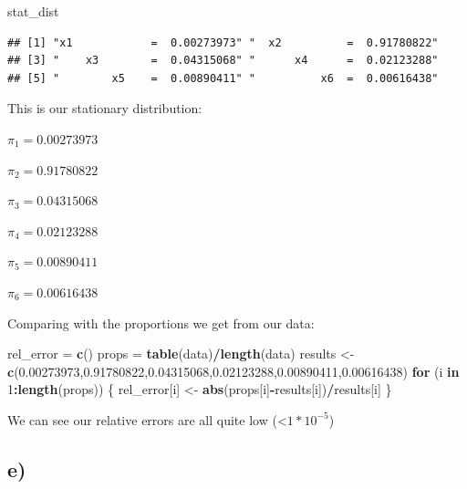\documentclass[]{article}
\newenvironment{Shaded}{\begin{snugshade}}{\end{snugshade}}
\newcommand{\ControlFlowTok}[1]{\textcolor[rgb]{0.13,0.29,0.53}{\textbf{#1}}}
\newcommand{\DecValTok}[1]{\textcolor[rgb]{0.00,0.00,0.81}{#1}}
\newcommand{\FloatTok}[1]{\textcolor[rgb]{0.00,0.00,0.81}{#1}}
\newcommand{\KeywordTok}[1]{\textcolor[rgb]{0.13,0.29,0.53}{\textbf{#1}}}
\newcommand{\NormalTok}[1]{#1}
\newcommand{\OperatorTok}[1]{\textcolor[rgb]{0.81,0.36,0.00}{\textbf{#1}}}
\newcommand{\StringTok}[1]{\textcolor[rgb]{0.31,0.60,0.02}{#1}}
\begin{document}
\begin{Shaded}
\begin{Highlighting}[]
\NormalTok{stat_dist}
\end{Highlighting}
\end{Shaded}

\begin{verbatim}
## [1] "x1            =  0.00273973" "  x2          =  0.91780822"
## [3] "    x3        =  0.04315068" "      x4      =  0.02123288"
## [5] "        x5    =  0.00890411" "          x6  =  0.00616438"
\end{verbatim}

This is our stationary distribution:

\(\pi_{1} = 0.00273973\)

\(\pi_{2} = 0.91780822\)

\(\pi_{3} = 0.04315068\)

\(\pi_{4} = 0.02123288\)

\(\pi_{5} = 0.00890411\)

\(\pi_{6} = 0.00616438\)

\newpage

Comparing with the proportions we get from our data:

\begin{Shaded}
\begin{Highlighting}[]
\NormalTok{rel_error =}\StringTok{ }\KeywordTok{c}\NormalTok{()}
\NormalTok{props =}\StringTok{ }\KeywordTok{table}\NormalTok{(data)}\OperatorTok{/}\KeywordTok{length}\NormalTok{(data)}
\NormalTok{results <-}\StringTok{ }\KeywordTok{c}\NormalTok{(}\FloatTok{0.00273973}\NormalTok{,}\FloatTok{0.91780822}\NormalTok{,}\FloatTok{0.04315068}\NormalTok{,}\FloatTok{0.02123288}\NormalTok{,}\FloatTok{0.00890411}\NormalTok{,}\FloatTok{0.00616438}\NormalTok{)}
\ControlFlowTok{for}\NormalTok{ (i }\ControlFlowTok{in} \DecValTok{1}\OperatorTok{:}\KeywordTok{length}\NormalTok{(props)) \{}
\NormalTok{    rel_error[i] <-}\StringTok{ }\KeywordTok{abs}\NormalTok{(props[i]}\OperatorTok{-}\NormalTok{results[i])}\OperatorTok{/}\NormalTok{results[i]}
\NormalTok{\}}
\end{Highlighting}
\end{Shaded}

We can see our relative errors are all quite low
(\textless{}\(1*10^{-5}\))

\hypertarget{e}{%
\subsection{e)}\label{e}}
\end{document}
